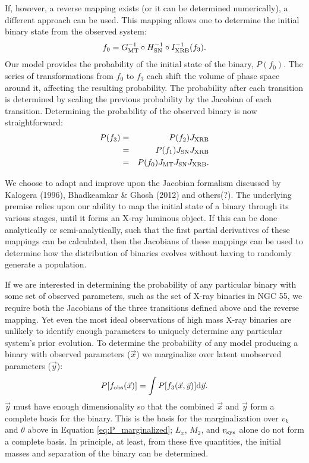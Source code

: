 \documentclass[12pt, preprint]{aastex}
\newcommand{\dd}{\mathrm{d}}
\begin{document}
If, however, a reverse mapping exists (or it can be determined numerically), a different approach can be used. This mapping allows one to determine the initial binary state from the observed system:
\begin{equation}
f_0 = G_{\rm MT}^{-1} \circ H_{\rm SN}^{-1} \circ I_{\rm XRB}^{-1} (f_3) .
\end{equation}
Our model provides the probability of the initial state of the binary, $P(f_0)$. The series of transformations from $f_0$ to $f_3$ each shift the volume of phase space around it, affecting the resulting probability. The probability after each transition is determined by scaling the previous probability by the Jacobian of each transition. Determining the probability of the observed binary is now straightforward:
\begin{eqnarray}
P(f_3) &=& P(f_2)  J_{\rm XRB}  \\
  &=& P(f_1)  J_{\rm SN}  J_{\rm XRB}  \\
  &=& P(f_0)  J_{\rm MT}  J_{\rm SN}  J_{\rm XRB} .
\end{eqnarray}


We choose to adapt and improve upon the Jacobian formalism discussed by Kalogera (1996), Bhadkeamkar \& Ghosh (2012) and others(?). The underlying premise relies upon our ability to map the initial state of a binary through its various stages, until it forms an X-ray luminous object. If this can be done analytically or semi-analytically, such that the first partial derivatives of these mappings can be calculated, then the Jacobians of these mappings can be used to determine how the distribution of binaries evolves without having to randomly generate a population.

If we are interested in determining the probability of any particular binary with some set of observed parameters, such as the set of X-ray binaries in NGC 55, we require both the Jacobians of the three transitions defined above and the reverse mapping. Yet even the most ideal observations of high mass X-ray binaries are unlikely to identify enough parameters to uniquely determine any particular system's prior evolution. To determine the probability of any model producing a binary with observed parameters ($\vec{x}$) we marginalize over latent unobserved parameters ($\vec{y}$):
\begin{equation}
P[f_{\rm obs}(\vec{x})] = \int P[f_3(\vec{x}, \vec{y})] \dd \vec{y}.
\end{equation}
$\vec{y}$ must have enough dimensionality so that the combined $\vec{x}$ and $\vec{y}$ form a complete basis for the binary. This is the basis for the marginalization over $v_k$ and $\theta$ above in Equation \ref{eq:P_marginalized}; $L_x$, $M_2$, and $v_{\rm sys}$ alone do not form a complete basis. In principle, at least, from these five quantities, the initial masses and separation of the binary can be determined.
\end{document}
